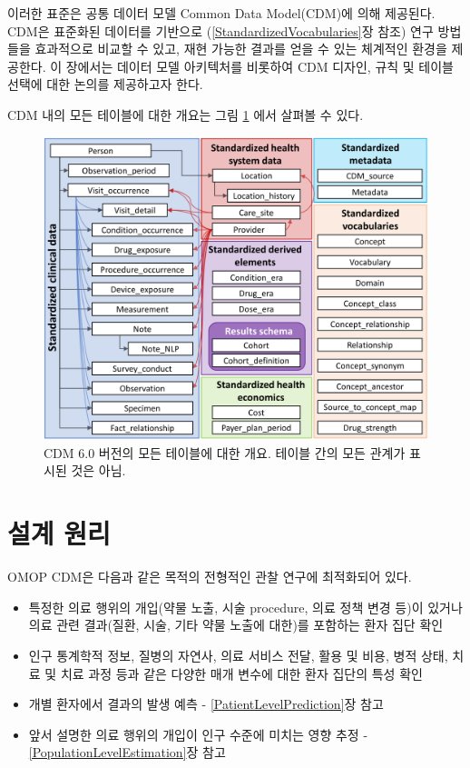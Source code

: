 \documentclass[10.5pt]{book}
\providecommand{\tightlist}{%
  \setlength{\itemsep}{0pt}\setlength{\parskip}{0pt}}
\theoremstyle{definition}
\theoremstyle{definition}
\theoremstyle{definition}
\theoremstyle{remark}
\begin{document}
이러한 표준은 공통 데이터 모델 Common Data Model(CDM)에 의해 제공된다.
CDM은 표준화된 데이터를 기반으로 (\ref{StandardizedVocabularies}장 참조)
연구 방법들을 효과적으로 비교할 수 있고, 재현 가능한 결과를 얻을 수 있는
체계적인 환경을 제공한다. 이 장에서는 데이터 모델 아키텍처를 비롯하여
CDM 디자인, 규칙 및 테이블 선택에 대한 논의를 제공하고자 한다.

CDM 내의 모든 테이블에 대한 개요는 그림 \ref{fig:cdmDiagram}
에서 살펴볼 수 있다.

\begin{figure}
\includegraphics[width=1\linewidth]{images/CommonDataModel/cdmDiagram} \caption{CDM 6.0 버전의 모든 테이블에 대한 개요. 테이블 간의 모든 관계가 표시된 것은 아님.}\label{fig:cdmDiagram}
\end{figure}

\section{설계 원리}\label{-}

OMOP CDM은 다음과 같은 목적의 전형적인 관찰 연구에 최적화되어
있다.

\begin{itemize}
\tightlist
\item
  특정한 의료 행위의 개입(약물 노출, 시술 procedure, 의료 정책 변경
  등)이 있거나 의료 관련 결과(질환, 시술, 기타 약물 노출에 대한)를
  포함하는 환자 집단 확인
\item
  인구 통계학적 정보, 질병의 자연사, 의료 서비스 전달, 활용 및 비용,
  병적 상태, 치료 및 치료 과정 등과 같은 다양한 매개 변수에 대한 환자
  집단의 특성 확인
\item
  개별 환자에서 결과의 발생 예측 - \ref{PatientLevelPrediction}장 참고
\item
  앞서 설명한 의료 행위의 개입이 인구 수준에 미치는 영향 추정 -
  \ref{PopulationLevelEstimation}장 참고
\end{itemize}
\end{document}
